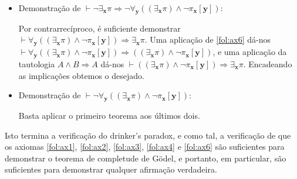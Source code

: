 \documentclass{report}
\theoremstyle{definition}
\theoremstyle{remark}
\renewcommand{\bf}[1]{\mathbf{#1}}
\newcommand{\imply}{\mathbin{\Rightarrow}}
\begin{document}
\begin{itemize}
	\item Demonstração de $\vdash \neg \exists_{\bf x} \pi \imply \neg \forall_{\bf y} ( (\exists_{\bf x} \pi) \land \neg \pi_{\bf x}[\bf y])$:

	Por contrarrecíproco, é suficiente demonstrar $\vdash \forall_{\bf y} ( (\exists_{\bf x} \pi) \land \neg \pi_{\bf x}[\bf y]) \imply \exists_{\bf x} \pi$. Uma aplicação de \eqref{fol:ax6} dá-nos $\vdash \forall_{\bf y} ( (\exists_{\bf x} \pi) \land \neg \pi_{\bf x}[\bf y]) \imply ( (\exists_{\bf x} \pi) \land \neg \pi_{\bf x}[\bf y])$, e uma aplicação da tautologia $A \land B \imply A$ dá-nos $\vdash ( (\exists_{\bf x} \pi) \land \neg \pi_{\bf x}[\bf y]) \imply \exists_{\bf x} \pi$. Encadeando as implicações obtemos o desejado.

	\item Demonstração de $\vdash \neg \forall_{\bf y} ( (\exists_{\bf x} \pi) \land \neg \pi_{\bf x}[\bf y])$:

	Basta aplicar o primeiro teorema aos últimos dois.
	\end{itemize}

	Isto termina a verificação do drinker's paradox, e como tal, a verificação de que os axiomas \eqref{fol:ax1}, \eqref{fol:ax2}, \eqref{fol:ax3}, \eqref{fol:ax4} e \eqref{fol:ax6} são suficientes para demonstrar o teorema de completude de Gödel, e portanto, em particular, são suficientes para demonstrar qualquer afirmação verdadeira. 
	
	\nocite{fltc}
	\nocite{shoenfield}
	
	
	
\end{document}
